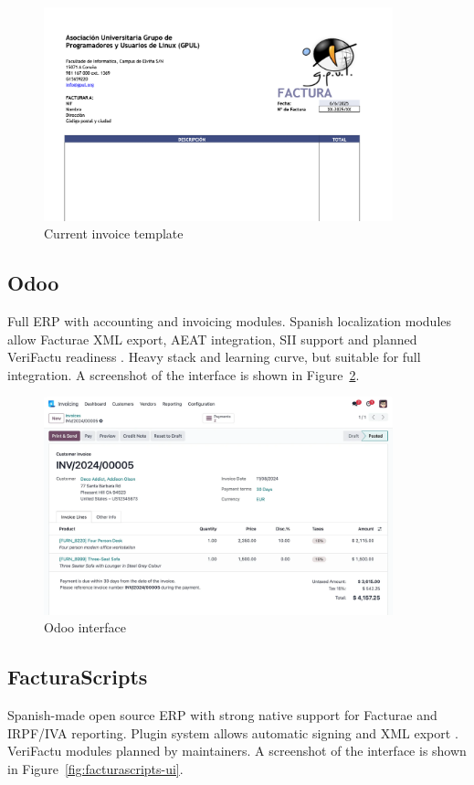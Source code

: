\begin{figure}[H]
  \centering
  \includegraphics[width=0.9\textwidth]{imaxes/invoice.png}
  \caption{Current invoice template}
  \label{fig:invoice}
\end{figure}

\subsection*{Odoo}
Full ERP with accounting and invoicing modules. Spanish localization modules allow Facturae XML export, AEAT integration, SII support and planned VeriFactu readiness \cite{OdooEInvoiceSpain, OdooBlogVerifactu}. Heavy stack and learning curve, but suitable for full integration. A screenshot of the interface is shown in Figure~\ref{fig:odoo-ui}.

\begin{figure}[H]
  \centering
  \includegraphics[width=0.9\textwidth]{imaxes/odoo-ui.png}
  \caption{Odoo interface}
  \label{fig:odoo-ui}
\end{figure}

\subsection*{FacturaScripts}
Spanish-made open source ERP with strong native support for Facturae and IRPF/IVA reporting. Plugin system allows automatic signing and XML export \cite{FacturaScriptsAntifraude}. VeriFactu modules planned by maintainers. A screenshot of the interface is shown in Figure~\ref{fig:facturascripts-ui}.

